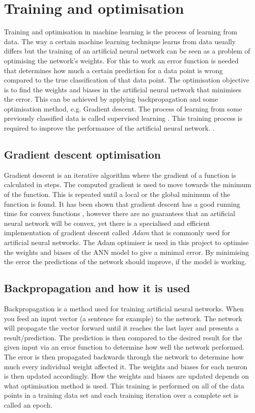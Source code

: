 \section{Training and optimisation} \label{sec:trainingoptimisation}
Training and optimisation in machine learning is the process of learning from data. The way a certain machine learning technique learns from data usually differs but the training of an artificial neural network can be seen as a problem of optimising the network's weights. For this to work an error function is needed that determines how much a certain prediction for a data point is wrong compared to the true classification of that data point. The optimisation objective is to find the weights and biases in the artificial neural network that minimises the error. This can be achieved by applying backpropagation and some optimisation method, e.g. Gradient descent. The process of learning from some previously classified data is called supervised learning \parencite{lecun2015deep}. This training process is required to improve the performance of  the artificial neural network. \parencite{Goodfellow-et-al-2016}.

\subsection{Gradient descent optimisation}\label{sec:gradient_descent}
Gradient descent is an iterative algorithm where the gradient of a function is calculated in steps. The computed gradient is used to move towards the minimum of the function. This is repeated until a local or the global minimum of the function is found. It has been shown that gradient descent has a good running time for convex functions \parencite{convexSGD}, however there are no guarantees that an artificial neural network will be convex, yet there is a specialised and efficient implementation of gradient descent called \textit{Adam} \parencite{adamoptimizer} that is commonly used for artificial neural networks. The Adam optimiser is used in this project to optimise the weights and biases of the ANN model to give a minimal error. By minimising the error the predictions of the network should improve, if the model is working.

\subsection{Backpropagation and how it is used}\label{sec:backpropagation}
Backpropagation is a method used for training artificial neural networks. When you feed an input vector (a sentence for example) to the network. The network will propagate the vector forward until it reaches the last layer and presents a result/prediction. The prediction is then compared to the desired result for the given input via an error function to determine how well the network performed. The error is then propagated backwards through the network to determine how much every individual weight affected it. The weights and biases for each neuron is then updated accordingly. How the weights and biases are updated depends on what optimisation method is used. This training is performed on all of the data points in a training data set and each training iteration over a complete set is called an epoch.

